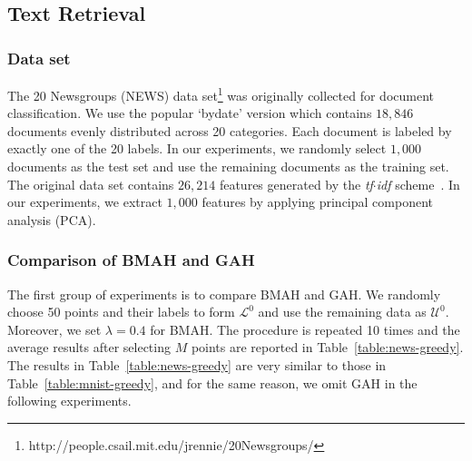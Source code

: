 \subsection{Text Retrieval}

\subsubsection{Data set}

The 20 Newsgroups (\mbox{NEWS}) data set\footnote{http://people.csail.mit.edu/jrennie/20Newsgroups/} was originally collected for document classification. We use the popular `bydate' version which contains $18{,}846$ documents evenly distributed across 20 categories. Each document is labeled by exactly one of the 20 labels. In our experiments, we randomly select $1{,}000$ documents as the test set and use the remaining documents as the training set. The original data set contains $26{,}214$ features generated by the \emph{tf$\cdot$idf} scheme~\cite{salton1988ipm}. In our experiments, we extract $1{,}000$ features by applying principal component analysis (\mbox{PCA}).

\subsubsection{Comparison of \mbox{BMAH} and \mbox{GAH}}
\label{section:comp-bmah-gah-news}

The first group of experiments is to compare \mbox{BMAH} and \mbox{GAH}. We randomly choose 50 points and their labels to form $\mathcal{L}^0$ and use the remaining data as $\mathcal{U}^0$. Moreover, we set $\lambda=0.4$ for \mbox{BMAH}. The procedure is repeated 10 times and the average results after selecting $M$ points are reported in Table~\ref{table:news-greedy}. The results in Table~\ref{table:news-greedy} are very similar to those in Table~\ref{table:mnist-greedy}, and for the same reason, we omit \mbox{GAH} in the following experiments.

